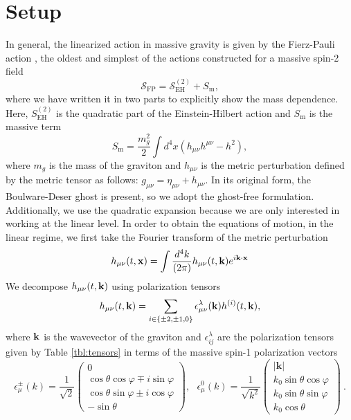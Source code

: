 \documentclass[prd,aps,psfig,nofootinbib,nobibnotes,superscriptaddress,preprintnumbers,times]{revtex4-2}\setlength{\topmargin}{-14mm}
\begin{document}
\section{Setup}\label{sec:setup}
In general, the linearized action in massive gravity is given by the Fierz-Pauli action \cite{Fierz:1939ix}, the oldest and simplest of the actions constructed for a massive spin-2 field
\begin{equation}\label{eqn:action}
    \mathcal{S}_{\text{FP}} = \mathcal{S}_{\text{EH}}^{(2)} + S_{\text{m}},
\end{equation}
where we have written it in two parts to explicitly show the mass dependence. Here, $S_{\text{EH}}^{(2)}$ is the quadratic part of the Einstein-Hilbert action and $S_{\text{m}}$ is the massive term
\begin{equation} \label{eqn:action_m}
    S_{\text{m}} = \frac{m_g^2}{2}\int d^4x (h_{\mu\nu}h^{\mu\nu} - h^2),
\end{equation} 
where $m_{g}$ is the mass of the graviton and $h_{\mu\nu}$ is the metric perturbation defined by the metric tensor as follows: $g_{\mu\nu} = \eta_{\mu\nu} + h_{\mu\nu}$. In its original form, the Boulware-Deser ghost is present, so we adopt the ghost-free formulation. Additionally, we use the quadratic expansion because we are only interested in working at the linear level. In order to obtain the equations of motion, in the linear regime, we first take the Fourier transform of the metric perturbation 
\begin{equation}\label{eqn:fourier}
    h_{\mu\nu}(t, {\bf x}) = \int \frac{d^4 k}{(2\pi)}h_{\mu\nu}(t, {\bf k})e^{i{\bf k}\cdot{\bf x}}
\end{equation}
We decompose $h_{\mu\nu}(t, {\bf k}) $ using polarization tensors
\begin{equation}\label{eqn:decomp}
    h_{\mu\nu}(t, {\bf k}) = \sum_{i \in \{\pm 2, \pm 1,0\} } \epsilon^\lambda_{\mu\nu}({\bf k})h^{(i)}(t, {\bf k}),
\end{equation}
where ${\bf k}$ is the wavevector of the graviton and $\epsilon^\lambda_{ij}$ are the polarization tensors given by Table \ref{tbl:tensors} in terms of the massive spin-1 polarization vectors
\begin{equation}\label{eqn:pol_vec}
    \epsilon_\mu^{\pm}(k) = \frac{1}{\sqrt{2}} 
\begin{pmatrix}
0 \\
\cos\theta \cos\varphi \mp i \sin\varphi \\
\cos\theta \sin\varphi \pm i \cos\varphi \\
- \sin\theta
\end{pmatrix}
, \ \ \ \epsilon_\mu^{0}(k) = \frac{1}{\sqrt{k^2}} 
\begin{pmatrix}
|\mathbf{k}| \\
k_0 \sin\theta \cos\varphi \\
k_0 \sin\theta \sin\varphi \\
k_0 \cos\theta
\end{pmatrix} \ .
\end{equation}
\end{document}
